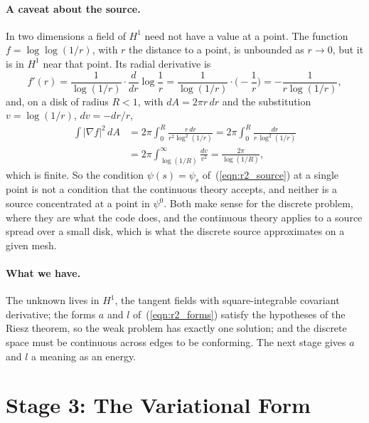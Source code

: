 \paragraph{A caveat about the source.} In two dimensions a field of $H^1$ need not have a value at a point. The function $f = \log\log(1/r)$, with $r$ the distance to a point, is unbounded as $r \to 0$, but it is in $H^1$ near that point. Its radial derivative is
\begin{equation*}
f'(r) = \frac{1}{\log(1/r)}\cdot\frac{d}{dr}\log\frac1r = \frac{1}{\log(1/r)}\cdot\Big(-\frac1r\Big) = -\frac{1}{r\log(1/r)} ,
\end{equation*}
and, on a disk of radius $R < 1$, with $dA = 2\pi r\, dr$ and the substitution $v = \log(1/r)$, $dv = -dr/r$,
\begin{equation*}
\begin{aligned}
\int |\nabla f|^2\, dA &= 2\pi\int_0^R \frac{r\, dr}{r^2\log^2(1/r)} = 2\pi\int_0^R\frac{dr}{r\,\log^2(1/r)} \\
&= 2\pi\int_{\log(1/R)}^\infty \frac{dv}{v^2} = \frac{2\pi}{\log(1/R)} ,
\end{aligned}
\end{equation*}
which is finite. So the condition $\psi(s) = \psi_s$ of~(\ref{eqn:r2_source}) at a single point is not a condition that the continuous theory accepts, and neither is a source concentrated at a point in $\psi^0$. Both make sense for the discrete problem, where they are what the code does, and the continuous theory applies to a source spread over a small disk, which is what the discrete source approximates on a given mesh.

\paragraph{What we have.} The unknown lives in $H^1$, the tangent fields with square-integrable covariant derivative; the forms $a$ and $l$ of~(\ref{eqn:r2_forms}) satisfy the hypotheses of the Riesz theorem, so the weak problem has exactly one solution; and the discrete space must be continuous across edges to be conforming. The next stage gives $a$ and $l$ a meaning as an energy.

\section{Stage 3: The Variational Form}
\label{section:r2_stage3}


